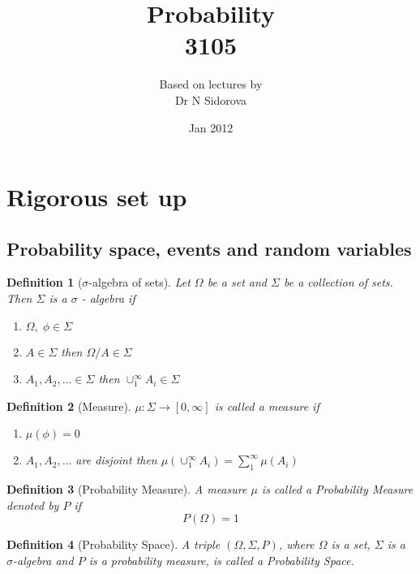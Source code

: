 \documentclass[12pt]{article}
\newtheorem{definition}{Definition}[section]
\begin{document}
\title{Probability \\ 3105}
\author{Based on lectures by\\Dr N Sidorova}
\date{Jan 2012}
\maketitle

\tableofcontents
\setcounter{tocdepth}{4}
\newpage

\section{Rigorous set up}

\subsection{Probability space, events and random variables}
\begin{definition}[$\sigma$-algebra of sets]
Let $\Omega$ be a set and $\Sigma$ be a collection of sets. Then $\Sigma$ is a $\sigma$ - algebra if
\begin{enumerate}
\item $\Omega, \; \phi \in \Sigma$
\item $A \in \Sigma$ then $\Omega/A \in \Sigma$
\item $A_1, A_2, \dots \in \Sigma$ then $\cup_{1}^{\infty}A_i \in \Sigma$
\end{enumerate}
\end{definition}

\begin{definition}[Measure]
$\mu:\Sigma \rightarrow [0,\infty]$ is called a measure if
\begin{enumerate}
\item $\mu(\phi) = 0$
\item $A_1, A_2, \dots$ are disjoint then $\mu(\cup_{1}^{\infty}A_i) = \sum_{1}^{\infty}\mu(A_i)$
\end{enumerate}
\end{definition}

\begin{definition}[Probability Measure] 
A measure $\mu$ is called a Probability Measure denoted by $P$ if \[P(\Omega) =1\]
\end{definition}

\begin{definition}[Probability Space]
A triple $(\Omega, \Sigma, P)$, where $\Omega$ is a set, $\Sigma$ is a $\sigma$-algebra and $P$ is a probability measure, is called a Probability Space.  
\end{definition}
\end{document}
